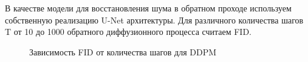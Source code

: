 \documentclass{article}
\begin{document}
В качестве модели для восстановления шума в обратном проходе используем собственную реализацию U-Net архитектуры. Для различного количества шагов T от 10 до 1000 обратного диффузионного процесса считаем FID. 
\newpage

\begin{figure}[h]
	\caption{Зависимость FID от количества шагов для DDPM}
\end{figure}
\end{document}
